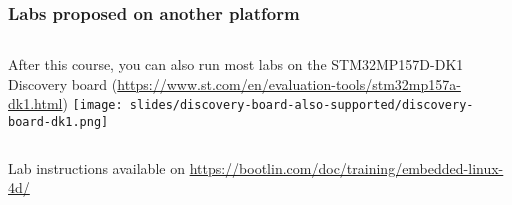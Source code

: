 \begin{frame}
\frametitle{Labs proposed on another platform}
  \begin{columns}
    After this course, you can also run most labs on the STM32MP157D-DK1 Discovery board
    (\url{https://www.st.com/en/evaluation-tools/stm32mp157a-dk1.html})
    \texttt{[image: slides/discovery-board-also-supported/discovery-board-dk1.png]}
  \end{columns}
  \vspace{1cm}
  Lab instructions available on
  \url{https://bootlin.com/doc/training/embedded-linux-4d/}
\end{frame}
